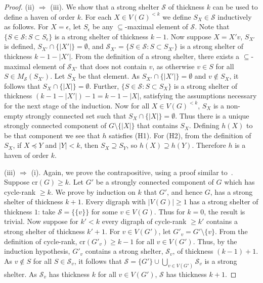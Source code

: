 \documentclass{llncs}
\newcommand{\letters}[1]{\{\!|#1|\!\}}
\newcommand{\st}{\mathrel{:}}
\newcommand{\cycr}[1]{\textrm{cr}(#1)}
\begin{document}
\begin{proof}
(ii) $\Rightarrow$ (iii).  We show that a strong shelter $\mathcal{S}$ of thickness $k$ can be used to define a haven of order $k$.  For each $X \in V(G)^{<k}$ we define $S_X \in \mathcal{S}$ inductively as follows.  For $X = \epsilon$, let $S_\epsilon$ be any $\subseteq$-maximal element of $\mathcal{S}$.  Note that $\{ S \in \mathcal{S}\st S \subset S_{\epsilon}\}$ is a strong shelter of thickness $k-1$.  Now suppose $X = X'v$, $S_{X'}$ is defined, $S_{X'} \cap \letters{X'} = \emptyset$, and $\mathcal{S}_{X'} = \{S \in \mathcal{S}\st S \subset S_{X'}\}$ is a strong shelter of thickness $k-1-|X'|$.  From the definition of a strong shelter, there exists a $\subseteq$-maximal element of $\mathcal{S}_{X'}$ that does not contain $v$, as otherwise $v \in S$ for all $S \in M_{\mathcal{S}}(S_{X'})$.  Let $S_X$ be that element.  As $S_{X'} \cap \letters{X'} = \emptyset$ and $v \notin S_X$, it follows that $S_X \cap \letters{X} = \emptyset$.  Further, $\{S \in \mathcal{S}\st S \subset S_X\}$ is a strong shelter of thickness $(k-1-|X'|)-1 = k-1-|X|$, satisfying the assumptions necessary for the next stage of the induction.  
Now for all $X \in V(G)^{<k}$, $S_X$ is a non-empty strongly connected set such that $S_X \cap \letters{X} = \emptyset$.  Thus there is a unique strongly connected component of $G\setminus \letters{X}$ that contains $S_X$.  Defining $h(X)$ to be that component we see that $h$ satisfies (H1).  For (H2), from the definition of $S_X$, if $X \preceq Y$ and $|Y|<k$, then $S_X \supseteq S_Y$, so $h(X) \supseteq h(Y)$.  Therefore $h$ is a haven of order $k$.

(iii) $\Rightarrow$ (i).  Again, we prove the contrapositive, using a proof similar to~\cite{GT11}.  Suppose $\cycr{G} \geq k$.  Let $G'$ be a strongly connected component of $G$ which has cycle-rank $\geq k$.
We prove by induction on $k$ that $G'$, and hence $G$, has a strong shelter of thickness $k+1$.  Every digraph with $|V(G)|\geq 1$ has a strong shelter of thickness $1$: take $\mathcal{S} = \{\{v\}\}$ for some $v \in V(G)$.  Thus for $k=0$, the result is trivial.  Now suppose for $k'<k$ every digraph of cycle-rank $\geq k'$ contains a strong shelter of thickness $k'+1$.  For $v \in V(G')$, let $G'_v = G' \setminus \{v\}$.  From the definition of cycle-rank, $\cycr{G'_v} \geq k-1$ for all $v \in V(G')$.  Thus, by the induction hypothesis, $G'_v$ contains a strong shelter, $\mathcal{S}_v$, of thickness $(k-1)+1$.  As $v \notin S$ for all $S \in \mathcal{S}_v$, it follows that $\mathcal{S} = \{G'\} \cup \bigcup_{v \in V(G')} \mathcal{S}_v$ is a strong shelter.  As $\mathcal{S}_v$ has thickness $k$ for all $v \in V(G')$, $\mathcal{S}$ has thickness $k+1$.
\end{proof}
\end{document}
